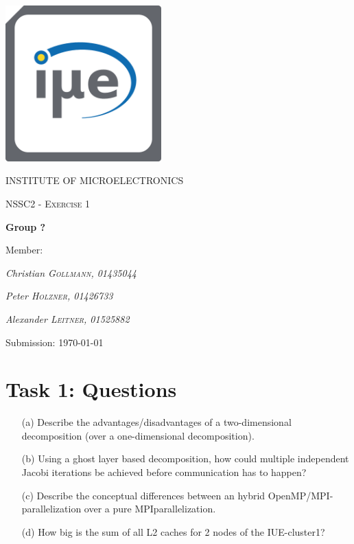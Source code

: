 \documentclass[11pt,a4paper]{article}
\begin{document}
\begin{titlepage}
	\centering
	\begin{center}
	\includegraphics[width=6cm]{Bilder/IuE-Logo.png}
	\end{center}
	{\scshape\LARGE INSTITUTE OF MICROELECTRONICS\par}
	\vspace{1cm}
	{\scshape\Large NSSC2 - Exercise 1\par}
	\vspace{1.5cm}
	{\huge\bfseries Group ?\par}
	\vspace{2cm}
	Member:\par
	{\Large\itshape Christian \textsc{Gollmann, 01435044}\par}
	{\Large\itshape Peter \textsc{Holzner, 01426733}\par}
	{\Large\itshape Alexander \textsc{Leitner, 01525882}\par}
	\vspace{1.5cm}
	Submission: \today\par
	\vfill
\end{titlepage}
\tableofcontents 
\thispagestyle{empty}
\newpage

\setcounter{page}{1}
\section{Task 1: Questions}
\begin{itemize}	
\item[(a)] Describe the advantages/disadvantages of a two-dimensional decomposition (over a one-dimensional decomposition).
\item[(b)] Using a ghost layer based decomposition, how could multiple independent Jacobi iterations be achieved
before communication has to happen?
\item[(c)] Describe the conceptual differences between an hybrid OpenMP/MPI-parallelization over a pure MPIparallelization.
\item[(d)] How big is the sum of all L2 caches for 2 nodes of the IUE-cluster1?
\end{itemize}
\newpage
\end{document}
